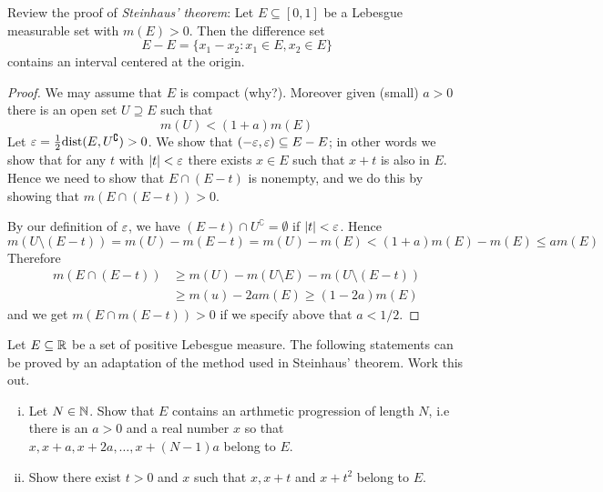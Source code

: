 \begin{problem}
  Review the proof of \textit{Steinhaus' theorem}: Let $E \subseteq [0, 1]$ be a Lebesgue 
  measurable set with $m(E) > 0$. Then the difference set
  \[E-E = \{x_1 - x_2 : x_1 \in E, x_2 \in E\}\]
  contains an interval centered at the origin.
\end{problem}

\begin{proof}
  We may assume that $E$ is compact (why?). Moreover given (small)
  $a > 0$ there is an open set $U \supseteq E$ such that
  \[m(U) < (1+a)m(E)\]
  Let $\varepsilon = \frac12 \mathrm{dist}(E, U^\complement) > 0$. We show that 
  $(-\varepsilon, \varepsilon) \subseteq E-E$; in other words we show that for any $t$
  with $|t| < \varepsilon$ there exists $x \in E$ such that $x+t$ is also in $E$.
  Hence we need to show that $E \cap (E -t)$ is nonempty, and we do this
  by showing that $m(E \cap (E-t)) > 0$.

  By our definition of $\varepsilon$, we have $(E-t)\cap U^\complement = \emptyset$
  if $|t| < \varepsilon$. Hence
  \[m(U\setminus(E-t)) = m(U) - m(E-t)=m(U)-m(E)<(1+a)m(E)-m(E) \le am(E)\]
  Therefore
  \begin{align*}
    m(E \cap (E-t)) &\ge m(U) - m(U\setminus E) - m(U\setminus(E-t)) \\
    &\ge m(u) -2am(E) \ge (1-2a)m(E) 
  \end{align*}
  and we get $m(E \cap m(E-t)) > 0$ if we specify above that $a < 1/2$.
\end{proof}

\begin{problem}
  Let $E \subseteq \mathbb R$ be a set of positive Lebesgue measure. The following 
  statements can be proved by an adaptation of the method used in Steinhaus' theorem. Work this out.
  \begin{enumerate}[(i)]
    \item Let $N \in \mathbb N$. Show that $E$ contains an arthmetic progression of length $N$, 
    i.e there is an $a > 0$ and a real number $x$ so that $x, x+a, x+2a, \dotsc, x+(N-1)a$
    belong to $E$.
    \item Show there exist $t > 0$ and $x$ such that $x, x+t$ and $x+t^2$ belong to $E$.
  \end{enumerate}
\end{problem}

